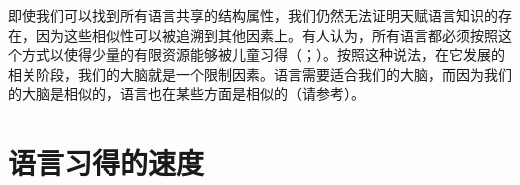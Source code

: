 即使我们可以找到所有语言共享的结构属性，我们仍然无法证明天赋语言知识的存在，因为这些相似性可以被追溯到其他因素上。有人认为，所有语言都必须按照这个方式以使得少量的有限资源能够被儿童习得（\citealp[\S~10.7.2]{Hurford2002a}；\citealp[]{Behrens2009a}）。按照这种说法，在它发展的相关阶段，我们的大脑就是一个限制因素。语言需要适合我们的大脑，而因为我们的大脑是相似的，语言也在某些方面是相似的（请参考\citealp[]{Kluender92a}）。

\section{语言习得的速度}
\label{Abschnitt-Geschwindigkeit-Spracherwerb}

